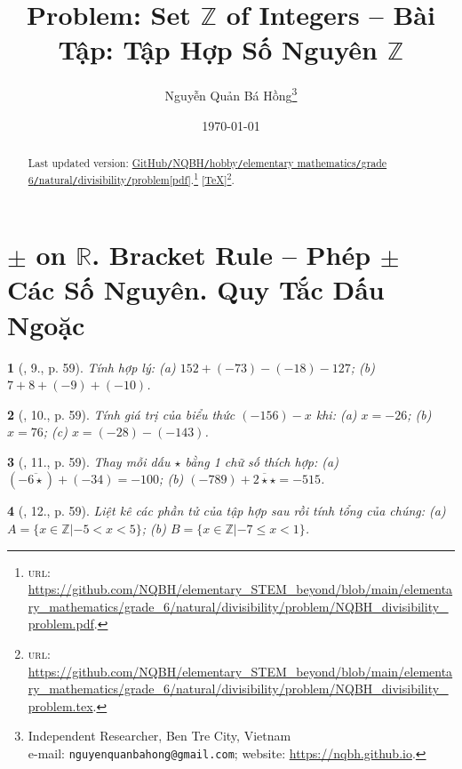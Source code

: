 \documentclass{article}
\title{Problem: Set $\mathbb{Z}$ of Integers -- Bài Tập: Tập Hợp Số Nguyên $\mathbb{Z}$}
\author{Nguyễn Quản Bá Hồng\footnote{Independent Researcher, Ben Tre City, Vietnam\\e-mail: \texttt{nguyenquanbahong@gmail.com}; website: \url{https://nqbh.github.io}.}}
\date{\today}
\newtheorem{baitoan}{}
\begin{document}
\maketitle
\begin{abstract}
	Last updated version: \href{https://github.com/NQBH/elementary_STEM_beyond/blob/main/elementary_mathematics/grade_6/natural/divisibility/problem/NQBH_divisibility_problem.pdf}{GitHub{\tt/}NQBH{\tt/}hobby{\tt/}elementary mathematics{\tt/}grade 6{\tt/}natural{\tt/}divisibility{\tt/}problem[pdf]}.\footnote{\textsc{url}: \url{https://github.com/NQBH/elementary_STEM_beyond/blob/main/elementary_mathematics/grade_6/natural/divisibility/problem/NQBH_divisibility_problem.pdf}.} [\href{https://github.com/NQBH/elementary_STEM_beyond/blob/main/elementary_mathematics/grade_6/natural/divisibility/problem/NQBH_divisibility_problem.tex}{\TeX}]\footnote{\textsc{url}: \url{https://github.com/NQBH/elementary_STEM_beyond/blob/main/elementary_mathematics/grade_6/natural/divisibility/problem/NQBH_divisibility_problem.tex}.}. 
\end{abstract}
\tableofcontents


\section{$\pm$ on $\mathbb{R}$. Bracket Rule -- Phép $\pm$ Các Số Nguyên. Quy Tắc Dấu Ngoặc}

\begin{baitoan}[\cite{Trong_Toan_6_2021}, 9., p. 59]
	Tính hợp lý: (a) $152 + (-73) - (-18) - 127$; (b) $7 + 8 + (-9) + (-10)$.
\end{baitoan}

\begin{baitoan}[\cite{Trong_Toan_6_2021}, 10., p. 59]
	Tính giá trị của biểu thức $(-156) - x$ khi: (a) $x = -26$; (b) $x = 76$; (c) $x = (-28) - (-143)$.
\end{baitoan}

\begin{baitoan}[\cite{Trong_Toan_6_2021}, 11., p. 59]
	Thay mỗi dấu $\star$ bằng 1 chữ số thích hợp: (a) $(-\overline{6\star}) + (-34) = -100$; (b) $(-789) + \overline{2\star\star} = -515$.
\end{baitoan}

\begin{baitoan}[\cite{Trong_Toan_6_2021}, 12., p. 59]
	Liệt kê các phần tử của tập hợp sau rồi tính tổng của chúng: (a) $A = \{x\in\mathbb{Z}|- 5 < x < 5\}$; (b) $B = \{x\in\mathbb{Z}|-7\le x < 1\}$.
\end{baitoan}
\end{document}
